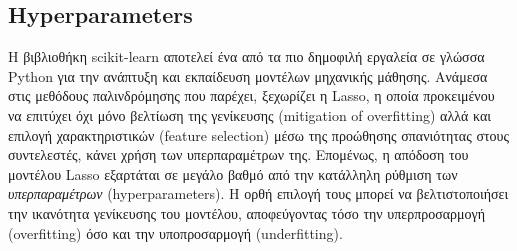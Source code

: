 \documentclass[12pt]{article}
\begin{document}
\subsection{\textlatin{Hyperparameters}}
Η βιβλιοθήκη \textlatin{scikit-learn} αποτελεί ένα από τα πιο δημοφιλή εργαλεία σε γλώσσα Python για την ανάπτυξη και εκπαίδευση μοντέλων μηχανικής μάθησης. Ανάμεσα στις μεθόδους παλινδρόμησης που παρέχει, ξεχωρίζει η \textlatin{Lasso}, η οποία προκειμένου να επιτύχει όχι μόνο βελτίωση της γενίκευσης \textlatin{(mitigation of overfitting)} αλλά και επιλογή χαρακτηριστικών \textlatin{(feature selection)} μέσω της προώθησης σπανιότητας στους συντελεστές, κάνει χρήση των υπερπαραμέτρων της. Επομένως, η απόδοση του μοντέλου \textlatin{Lasso} εξαρτάται σε μεγάλο βαθμό από την κατάλληλη ρύθμιση των \emph{υπερπαραμέτρων} (\textlatin{hyperparameters}). Η ορθή επιλογή τους μπορεί να βελτιστοποιήσει την ικανότητα γενίκευσης του μοντέλου, αποφεύγοντας τόσο την υπερπροσαρμογή \textlatin{(overfitting)} όσο και την υποπροσαρμογή \textlatin{(underfitting)}.
\end{document}
